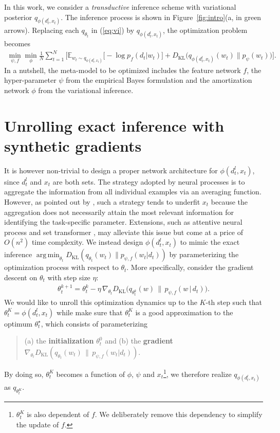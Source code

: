 \documentclass{article} \usepackage{iclr2020_conference,times}
\def\eqref#1{(\ref{#1})}
\newcommand{\E}{\mathbb{E}}
\DeclareMathOperator*{\argmin}{arg\,min}
\begin{document}
In this work, we consider a \emph{transductive} inference scheme with variational posterior $q_{\phi(d_t^l, x_t)}$.
The inference process is shown in Figure~\ref{fig:intro}(a, in green arrows).
Replacing each $q_{\theta_t}$ in \eqref{eq:vi} by $q_{\phi(d_t^l, x_t)}$,
the optimization problem becomes
\begin{align}
    \label{eq:avi}
    \min_{\psi,f} \min_{\phi} \frac{1}{N} \sum_{t=1}^N \Big[ \E_{w_t \sim q_{\phi(d_t^l, x_t)}} \big[ -\log p_f(d_t | w_t) \big] + D_\text{KL}\big(q_{\phi(d_t^l, x_t)}(w_t) \| p_\psi(w_t) \big) \Big].
\end{align}
In a nutshell, the meta-model to be optimized includes the feature network $f$, the hyper-parameter $\psi$ from the empirical Bayes formulation and the amortization network $\phi$ from the variational inference.

 \section{Unrolling exact inference with synthetic gradients}
\label{sec:alg}

It is however non-trivial to design a proper network architecture for $\phi(d_t^l, x_t)$, since $d_t^l$ and $x_t$ are both sets.
The strategy adopted by neural processes \citep{garnelo2018neural} is to aggregate the information from all individual examples via an averaging function.
However, as pointed out by \citet{kim2019attentive}, such a strategy tends to underfit $x_t$ 
because the aggregation does not necessarily attain the most relevant information for identifying the task-specific parameter.
Extensions, such as attentive neural process \citep{kim2019attentive} and set transformer \citep{lee2019set}, may alleviate this issue but come at a price of $O(n^2)$ time complexity.
We instead design $\phi(d_t^l, x_t)$ to mimic the exact inference $\argmin_{\theta_t} D_\text{KL}(q_{\theta_t}(w_t) \| p_{\psi, f}(w_t | d_t))$
by parameterizing the optimization process with respect to $\theta_t$. More specifically,
consider the gradient descent on $\theta_t$ with step size $\eta$:
\begin{align}
    \label{eq:gd}
    \theta_t^{k+1} = \theta_t^{k} - \eta \, \nabla_{\theta_t} D_\text{KL}\Big( q_{\theta_t^{k}}(w) \,\|\, p_{\psi, f}(w \,|\, d_t) \Big).
\end{align}
We would like to unroll this optimization dynamics up to the $K$-th step such that $\theta_t^K = \phi(d_t^l, x_t)$
while make sure that $\theta_t^K$ is a good approximation to the optimum $\theta_t^\star$,
which consists of parameterizing 
\begin{quote}
    (a) the \textbf{initialization} $\theta_t^0$ and 
    (b) the \textbf{gradient} $\nabla_{\theta_t} D_\text{KL}( q_{\theta_t}(w_t) \,\|\, p_{\psi, f}(w_t | d_t) )$.
\end{quote}
By doing so, $\theta_t^K$ becomes a function of $\phi$, $\psi$ and $x_t$\footnote{
$\theta_t^K$ is also dependent of $f$. We deliberately remove this dependency to simplify the update of $f$.}, 
we therefore realize $q_{\phi(d_t^l, x_t)}$ as $q_{\theta_t^K}$.
\end{document}
